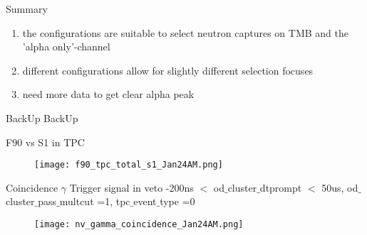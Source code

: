 \documentclass[9pt]{beamer}
\begin{document}
\begin{frame}{Summary}
\begin{enumerate}
\item the configurations are suitable to select neutron captures on TMB and the 'alpha only'-channel
\item different configurations allow for slightly different selection focuses
\item need more data to get clear alpha peak 
\end{enumerate}
\end{frame}



\begin{frame}{BackUp}
BackUp
\end{frame}

\begin{frame}{F90 vs S1 in TPC}
\begin{figure}
\texttt{[image: f90\_tpc\_total\_s1\_Jan24AM.png]}
\end{figure}
\end{frame}

\begin{frame}{Coincidence $\gamma$ Trigger signal in veto}
-200ns $<$ od$\_$cluster$\_$dtprompt $<$ 50us, od$\_$cluster$\_$pass$\_$multcut =1,  tpc$\_$event$\_$type =0

\begin{figure}
\texttt{[image: nv\_gamma\_coincidence\_Jan24AM.png]}
\end{figure}
\end{frame}
\end{document}

